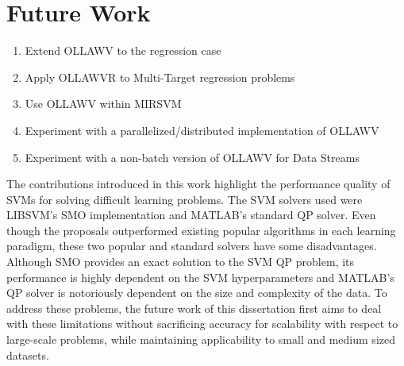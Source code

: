 \documentclass[reqno]{vcuthesis}
\numberwithin{equation}{chapter}
\begin{document}
\chapter{Future Work}
\begin{enumerate}
\item Extend OLLAWV to the regression case 
\item Apply OLLAWVR to Multi-Target regression problems
\item Use OLLAWV within MIRSVM
\item Experiment with a parallelized/distributed implementation of OLLAWV
\item Experiment with a non-batch version of OLLAWV for Data Streams
\end{enumerate}

The contributions introduced in this work highlight the performance quality of SVMs for solving difficult learning problems. The SVM solvers used were LIBSVM's SMO implementation and MATLAB's standard QP solver. Even though the proposals outperformed existing popular algorithms in each learning paradigm, these two popular and standard solvers have some disadvantages. Although SMO provides an exact solution to the SVM QP problem, its performance is highly dependent on the SVM hyperparameters and MATLAB's QP solver is notoriously dependent on the size and complexity of the data. To address these problems, the future work of this dissertation first aims to deal with these limitations without sacrificing accuracy for scalability with respect to large-scale problems, while maintaining applicability to small and medium sized datasets. 

\printbibliography[title={References}, heading=bibintoc]
\end{document}
